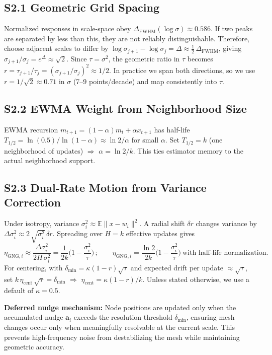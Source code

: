 \documentclass[11pt]{article}
\begin{document}
\subsection*{S2.1 Geometric Grid Spacing}
Normalized responses in scale-space obey $\Delta_{\mathrm{FWHM}}(\log\sigma)\approx 0.586$. If two peaks are separated by less than this, they are not reliably distinguishable. Therefore, choose adjacent scales to differ by $\log\sigma_{j+1}-\log\sigma_j = \Delta \approx \tfrac{1}{2}\,\Delta_{\mathrm{FWHM}}$, giving $\sigma_{j+1}/\sigma_j = e^{\Delta}\approx \sqrt{2}$. Since $\tau=\sigma^2$, the geometric ratio in $\tau$ becomes $r=\tau_{j+1}/\tau_j = (\sigma_{j+1}/\sigma_j)^2 \approx 1/2$. In practice we span both directions, so we use $r=1/\sqrt{2}\approx 0.71$ in $\sigma$ (7--9 points/decade) and map consistently into $\tau$.

\subsection*{S2.2 EWMA Weight from Neighborhood Size}
EWMA recursion $m_{t+1}=(1{-}\alpha)m_t+\alpha x_{t+1}$ has half-life $T_{1/2}=\ln(0.5)/\ln(1{-}\alpha)\approx \ln 2/\alpha$ for small $\alpha$. Set $T_{1/2}{=}k$ (one neighborhood of updates) $\Rightarrow$ $\alpha=\ln 2/k$. This ties estimator memory to the actual neighborhood support.

\subsection*{S2.3 Dual-Rate Motion from Variance Correction}
Under isotropy, variance $\sigma_i^2\approx\mathbb E\lVert x{-}w_i\rVert^2$. A radial shift $\delta r$ changes variance by $\Delta\sigma_i^2 \approx 2\,\sqrt{\sigma_i^2}\,\delta r$. Spreading over $H{=}k$ effective updates gives
\[\eta_{\mathrm{GNG},i} \approx \frac{\Delta\sigma_i^2}{2H\,\sigma_i^2} = \frac{1}{2k}\Big(1-\frac{\sigma_i^2}{\tau}\Big)\,;\qquad \eta_{\mathrm{GNG},i}=\frac{\ln 2}{2k}\Big(1-\frac{\sigma_i^2}{\tau}\Big)\ \text{with half-life normalization}.\]
For centering, with $\delta_{\min}=\kappa(1{-}r)\sqrt{\tau}$ and expected drift per update $\approx\sqrt{\tau}$, set $k\,\eta_{\mathrm{cent}}\,\sqrt{\tau}=\delta_{\min}$ $\Rightarrow$ $\eta_{\mathrm{cent}}=\kappa(1{-}r)/k$. Unless stated otherwise, we use a default of $\kappa=0.5$.

\textbf{Deferred nudge mechanism:} Node positions are updated only when the accumulated nudge $\mathbf{a}_i$ exceeds the resolution threshold $\delta_{\min}$, ensuring mesh changes occur only when meaningfully resolvable at the current scale. This prevents high-frequency noise from destabilizing the mesh while maintaining geometric accuracy.
\end{document}
